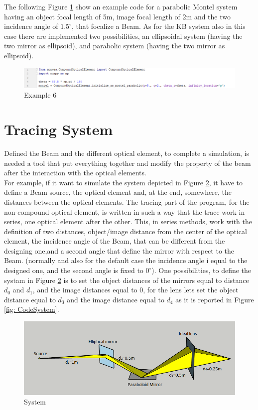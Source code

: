 The following Figure \ref{fig: CodeMontel} show an example code for a parabolic Montel system having an object focal length of 5m, image focal length of 2m and the two incidence angle of $1.5^{\circ} $, that focalize a Beam. As for the KB system also in this case there are implemented two possibilities, an ellipsoidal system (having the two mirror as ellipsoid), and parabolic system (having the two mirror as ellipsoid). 
\begin{figure}[H]
%
\centering
%
\includegraphics[width=1.\textwidth]{Immagini/Chapter3/CodeMontel}
%
\caption{Example 6}
%
\label{fig: CodeMontel}
%
\end{figure}
%
\section{Tracing System}
Defined the Beam and the different optical element, to complete a simulation, is needed a tool that put everything together and modify the property of the beam after the interaction with the optical elements.
\\
For example, if it want to simulate the system depicted in Figure \ref{fig: System}, it have to define a Beam source, the optical element and, at the end, somewhere, the distances between the optical elements. The tracing part of the program, for the non-compound optical element, is written in such a way that the trace work in series, one optical element after the other. This, in series methods, work with the definition of two distances, object/image distance from the center of the optical element, the incidence angle of the Beam, that can be different from the designing one,and a second angle that define the mirror with respect to the Beam. (normally and also for the default case the incidence angle i equal to the designed one, and the second angle is fixed to $0^{\circ} $). One possibilities, to define the systam in Figure \ref{fig: System} is to set the object distances of the mirrors equal to distance $d_0 $ and $d_1 $, and the image distances equal to $0 $, for the lens lets set the object distance equal to $d_3 $ and the image distance equal to $d_4 $ as it is reported in Figure \ref{fig: CodeSystem}.
\begin{figure}[H]
%
\centering
%
\includegraphics[width=1.0\textwidth]{Immagini/Chapter3/Cattura}
%
\caption{System}
%
\label{fig: System}
%
\end{figure}
